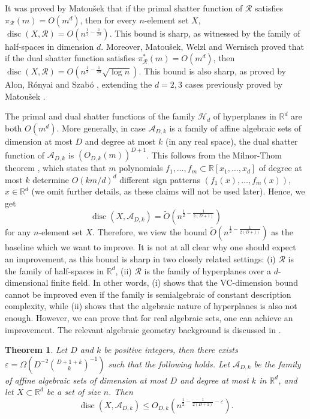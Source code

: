\documentclass[11pt]{article}
\theoremstyle{plain}
\newtheorem{theorem}{Theorem}[section]
\theoremstyle{definition}
\newcommand{\eps}{\varepsilon}
\DeclareMathOperator{\disc}{disc}
\begin{document}
	It was proved by Matou\v{s}ek \cite{MatVCdim} that if the primal shatter function of $\mathcal{R}$ satisfies $\pi_{\mathcal{R}}(m)=O(m^d)$, then for every $n$-element set $X$, $\disc(X,\mathcal{R})=O(n^{\frac{1}{2}-\frac{1}{2d}})$. This bound is sharp, as witnessed by the family of half-spaces in dimension $d$. Moreover, Matou\v{s}ek, Welzl and Wernisch \cite{MWW} proved that if the dual shatter function satisfies $\pi_{\mathcal{R}}^*(m)=O(m^d)$, then $\disc(X,\mathcal{R})=O(n^{\frac{1}{2}-\frac{1}{2d}}\sqrt{\log n})$. This bound is also sharp, as proved by Alon, R\'onyai and Szab\'o \cite{ARSz},  extending the $d=2,3$ cases previously proved by Matou\v{s}ek \cite{MatdualVC}.
	
	The primal and dual shatter functions of the family $\mathcal{H}_d$ of hyperplanes in $\mathbb{R}^d$ are both $O(m^d)$. More generally, in case $\mathcal{A}_{D,k}$ is a family of affine algebraic sets of dimension at most $D$ and degree at most $k$ (in any real space), the dual shatter function of $\mathcal{A}_{D,k}$ is $(O_{D,k}(m))^{D+1}$. This follows from the Milnor-Thom theorem \cite{Milnor,Thom}, which states that $m$ polynomials $f_1,\dots,f_m\subset \mathbb{R}[x_1,\dots,x_d]$ of degree at most $k$ determine $O(km/d)^{d}$ different sign patterns $(f_1(x),\dots,f_m(x))$, $x\in \mathbb{R}^d$ (we omit further details, as these claims will not be used later). Hence, we get 
	$$\disc(X,\mathcal{A}_{D,k})=\tilde{O}(n^{\frac{1}{2}-\frac{1}{2(D+1)}})$$
	for any $n$-element set $X$.  Therefore, we view the bound $\tilde{O}(n^{\frac{1}{2}-\frac{1}{2(D+1)}})$ as the baseline which we want to improve. It is not at all clear why one should expect an improvement, as this bound is sharp in two closely related settings: (i)  $\mathcal{R}$ is the family of half-spaces in $\mathbb{R}^d$, (ii) $\mathcal{R}$ is the family of hyperplanes over a $d$-dimensional finite field. In other words, (i) shows that the VC-dimension bound cannot be improved even if the family is semialgebraic of constant description complexity, while (ii) shows that the algebraic nature of hyperplanes is also not enough. However, we can prove that for real algebraic sets, one can achieve an improvement. The relevant algebraic geometry background is discussed in .
	
	\begin{theorem}\label{thm:main_upper}
		Let $D$ and $k$ be positive integers, then there exists $\eps=\Omega(D^{-2}\binom{D+1+k}{k}^{-1})$ such that the following holds. Let $\mathcal{A}_{D,k}$ be the family of affine algebraic sets of dimension at most $D$ and degree at most $k$ in $\mathbb{R}^d$, and let $X\subset \mathbb{R}^d$ be a set of size $n$. Then
		$$\disc(X,\mathcal{A}_{D,k})\leq O_{D,k}\left(n^{\frac{1}{2}-\frac{1}{2(D+1)}-\eps}\right).$$
	\end{theorem}
	
\end{document}
